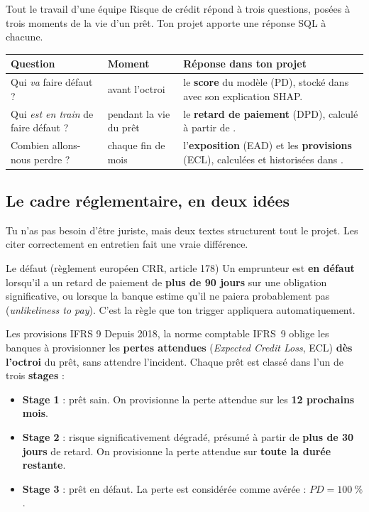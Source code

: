 Tout le travail d'une équipe Risque de crédit répond à trois questions, posées à trois moments de la vie
d'un prêt. Ton projet apporte une réponse SQL à chacune.

\begin{center}\small
\begin{tabularx}{\linewidth}{@{}B{3.9cm} P{2.6cm} L@{}}
\toprule
Question & Moment & Réponse dans ton projet \\
\midrule
Qui \emph{va} faire défaut ? & avant l'octroi & le \textbf{score} du modèle (PD), stocké dans
 avec son explication SHAP. \\
Qui \emph{est en train} de faire défaut ? & pendant la vie du prêt & le \textbf{retard de paiement} (DPD),
calculé à partir de . \\
Combien allons-nous perdre ? & chaque fin de mois & l'\textbf{exposition} (EAD) et les
\textbf{provisions} (ECL), calculées et historisées dans . \\
\bottomrule
\end{tabularx}
\end{center}

\subsection{Le cadre réglementaire, en deux idées}

Tu n'as pas besoin d'être juriste, mais deux textes structurent tout le projet. Les citer correctement en
entretien fait une vraie différence.

\begin{definition}{Le défaut (règlement européen CRR, article 178)}
Un emprunteur est \textbf{en défaut} lorsqu'il a un retard de paiement de \textbf{plus de 90 jours} sur
une obligation significative, ou lorsque la banque estime qu'il ne paiera probablement pas
(\emph{unlikeliness to pay}). C'est la règle que ton trigger appliquera automatiquement.
\end{definition}

\begin{definition}{Les provisions IFRS 9}
Depuis 2018, la norme comptable IFRS~9 oblige les banques à provisionner les \textbf{pertes attendues}
(\emph{Expected Credit Loss}, ECL) \textbf{dès l'octroi} du prêt, sans attendre l'incident. Chaque prêt
est classé dans l'un de trois \textbf{stages} :
\begin{itemize}
\item \textbf{Stage 1} : prêt sain. On provisionne la perte attendue sur les \textbf{12 prochains mois}.
\item \textbf{Stage 2} : risque significativement dégradé, présumé à partir de \textbf{plus de 30 jours}
de retard. On provisionne la perte attendue sur \textbf{toute la durée restante}.
\item \textbf{Stage 3} : prêt en défaut. La perte est considérée comme avérée : $PD = 100~\%$.
\end{itemize}
\end{definition}

